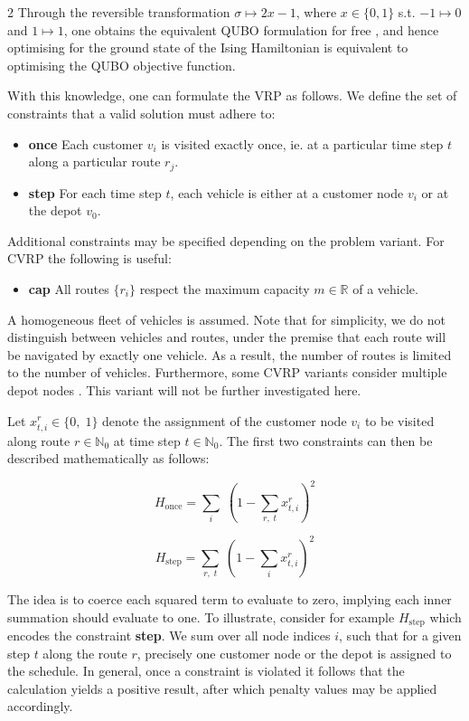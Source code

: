 \documentclass [10pt]{article}
\begin{document}
\begin {multicols}{2}
Through the reversible transformation $\sigma \mapsto 2x - 1$, where
$x \in \{0, 1\}$ s.t. $-1 \mapsto 0$ and $1 \mapsto 1$, one obtains the
equivalent QUBO formulation for free \cite{tutqubo}, and hence optimising for
the ground state of the Ising Hamiltonian is equivalent to optimising the
QUBO objective function.

With this knowledge, one can formulate the VRP as follows. We define the
set of constraints that a valid solution must adhere to:
\begin {itemize}
\item[\textbf{once}] Each customer $v_i$ is visited exactly once, ie. at a
	particular time step $t$ along a particular route $r_j$.
\item[\textbf{step}] For each time step $t$, each vehicle is either at a
	customer node $v_i$ or at the depot $v_0$.
\end {itemize}

Additional constraints may be specified depending on the problem variant.
For CVRP the following is useful:
\begin {itemize}
\item[\textbf{cap}] All routes $\{r_i\}$ respect the maximum capacity
	$m \in \mathbb R$ of a vehicle.
\end {itemize}

A homogeneous fleet of vehicles is assumed. Note that for simplicity, we do
not distinguish between vehicles and routes, under the premise that each route
will be navigated by exactly one vehicle. As a result, the number of routes is
limited to the number of vehicles. Furthermore, some CVRP variants consider
multiple depot nodes \cite{mdvrp}. This variant will not be further
investigated here.

Let $x_{t, i}^r \in \{0, \; 1\}$ denote the assignment of the customer node
$v_i$ to be visited along route $r \in \mathbb N_0$ at time step
$t \in \mathbb N_0$.
The first two constraints can then be described mathematically as follows:

\begin {equation}
H_{\text{once}} = \sum_i \; (1 - \sum_{r, \; t} x_{t, i}^r)^2
\end {equation}

\begin {equation}
H_{\text{step}} = \sum_{r, \; t} \; (1 - \sum_i x_{t, i}^r)^2
\end {equation}

The idea is to coerce each squared term to evaluate to zero, implying each
inner summation should evaluate to one. To illustrate, consider for example
$H_{\text{step}}$ which encodes the constraint \textbf{step}. We sum over all
node indices $i$, such that for a given step $t$ along the route $r$,
precisely one customer node or the depot is assigned to the schedule. In
general, once a constraint is violated it follows that the calculation yields
a positive result, after which penalty values may be applied accordingly.


\end{multicols}
\end{document}
